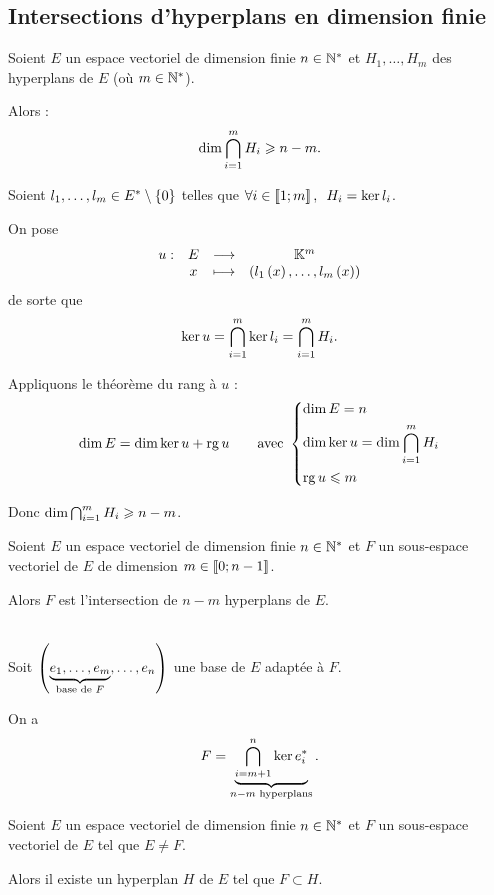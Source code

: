 \subsection{Intersections d'hyperplans en dimension finie}

\begin{prop}
Soient \(E\) un espace vectoriel de dimension finie \(n\in\mathbb{N}^*\) et \(H_1,\dots,H_m\) des hyperplans de \(E\) (où \(m\in\mathbb{N}^*\)).

Alors : \[\dim\bigcap_{i=1}^mH_i\geqslant n-m.\]
\end{prop}

\begin{dem}
Soient \(l_1,\dots,l_m\in E^{*}\setminus\left\lbrace0\right\rbrace\) telles que \(\quantifs{\forall i\in\interventierii{1}{m}}H_i=\ker l_i\).

On pose \[\begin{array}[t]{cccc}u : & E & \longrightarrow & \mathbb{K}^m \\ & x & \longmapsto & \left(l_1\left(x\right),\dots,l_m\left(x\right)\right)\end{array}\] de sorte que \[\ker u=\bigcap_{i=1}^m\ker l_i=\bigcap_{i=1}^mH_i.\]

Appliquons le théorème du rang à \(u\) : \[\dim E=\dim\ker u+\operatorname{rg} u\qquad\text{avec }\begin{dcases}
\dim E=n \\
\dim\ker u=\dim\bigcap_{i=1}^mH_i \\
\operatorname{rg} u\leqslant m
\end{dcases}\]

Donc \(\dim\bigcap_{i=1}^mH_i\geqslant n-m\).
\end{dem}

\begin{prop}
Soient \(E\) un espace vectoriel de dimension finie \(n\in\mathbb{N}^*\) et \(F\) un sous-espace vectoriel de \(E\) de dimension \(m\in\left\llbracket0;n-1\right\rrbracket\).

Alors \(F\) est l'intersection de \(n-m\) hyperplans de \(E\).
\end{prop}

\begin{dem}~\\
Soit \(\left(\underbrace{e_1,\dots,e_m}_{\text{base de }F},\dots,e_n\right)\) une base de \(E\) adaptée à \(F\).

On a \[F=\underbrace{\bigcap_{i=m+1}^n\ker e_i^{*}}_{n-m\text{ hyperplans}}.\]
\end{dem}

\begin{cor}
Soient \(E\) un espace vectoriel de dimension finie \(n\in\mathbb{N}^*\) et \(F\) un sous-espace vectoriel de \(E\) tel que \(E\not=F\).

Alors il existe un hyperplan \(H\) de \(E\) tel que \(F\subset H\).
\end{cor}

